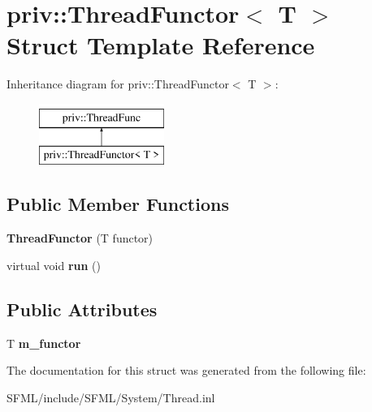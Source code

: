 \hypertarget{structpriv_1_1_thread_functor}{}\section{priv\+:\+:Thread\+Functor$<$ T $>$ Struct Template Reference}
\label{structpriv_1_1_thread_functor}
Inheritance diagram for priv\+:\+:Thread\+Functor$<$ T $>$\+:\begin{figure}[H]
\begin{center}
\leavevmode
\includegraphics[height=2.000000cm]{structpriv_1_1_thread_functor}
\end{center}
\end{figure}
\subsection*{Public Member Functions}
\begin{DoxyCompactItemize}
\item 
\mbox{\label{structpriv_1_1_thread_functor_a2df57df5cd6f7396b033512bb0e01848}} 
{\bfseries Thread\+Functor} (T functor)
\item 
\mbox{\label{structpriv_1_1_thread_functor_a8bb44b4b46d08d844d070ae3fdb251d7}} 
virtual void {\bfseries run} ()
\end{DoxyCompactItemize}
\subsection*{Public Attributes}
\begin{DoxyCompactItemize}
\item 
\mbox{\label{structpriv_1_1_thread_functor_a73254bbde4d3452de1aeda531ca632b2}} 
T {\bfseries m\+\_\+functor}
\end{DoxyCompactItemize}


The documentation for this struct was generated from the following file\+:\begin{DoxyCompactItemize}
\item 
S\+F\+M\+L/include/\+S\+F\+M\+L/\+System/Thread.\+inl\end{DoxyCompactItemize}
